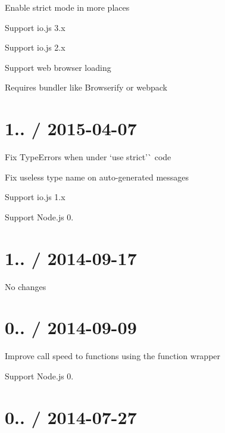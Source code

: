 
\begin{DoxyItemize}
\item Enable strict mode in more places
\item Support io.\+js 3.\+x
\item Support io.\+js 2.\+x
\item Support web browser loading
\begin{DoxyItemize}
\item Requires bundler like Browserify or webpack
\end{DoxyItemize}
\end{DoxyItemize}

\section*{1.. / 2015-\/04-\/07 }


\begin{DoxyItemize}
\item Fix {\ttfamily Type\+Error}s when under `\textquotesingle{}use strict'\`{} code
\item Fix useless type name on auto-\/generated messages
\item Support io.\+js 1.\+x
\item Support Node.\+js 0.
\end{DoxyItemize}

\section*{1.. / 2014-\/09-\/17 }


\begin{DoxyItemize}
\item No changes
\end{DoxyItemize}

\section*{0.. / 2014-\/09-\/09 }


\begin{DoxyItemize}
\item Improve call speed to functions using the function wrapper
\item Support Node.\+js 0.
\end{DoxyItemize}

\section*{0.. / 2014-\/07-\/27 }


